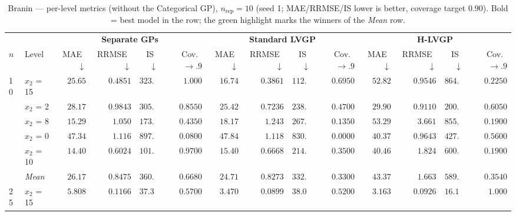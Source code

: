 \begin{table}[htbp]
\centering
\scriptsize
\setlength{\tabcolsep}{2.5pt}
\setlength{\fboxsep}{1pt}
\caption{Branin --- per-level metrics (without the Categorical GP), $n_{\mathrm{rep}}=10$ (seed 1; MAE/RRMSE/IS lower is better, coverage target $0.90$). Bold = best model in the row; the green highlight marks the winners of the \emph{Mean} row.}
\label{tab:branin_hetero_nrep10_nocat}
\begin{tabular}{llrrrrrrrrrrrr}
\toprule
 & & \multicolumn{4}{c}{\textbf{Separate GPs}} & \multicolumn{4}{c}{\textbf{Standard LVGP}} & \multicolumn{4}{c}{\textbf{H-LVGP}} \\
\cmidrule(lr){3-6} \cmidrule(lr){7-10} \cmidrule(lr){11-14}
$n$ & Level & MAE~$\downarrow$ & RRMSE~$\downarrow$ & IS~$\downarrow$ & Cov.~$\to.9$ & MAE~$\downarrow$ & RRMSE~$\downarrow$ & IS~$\downarrow$ & Cov.~$\to.9$ & MAE~$\downarrow$ & RRMSE~$\downarrow$ & IS~$\downarrow$ & Cov.~$\to.9$ \\
\midrule
\multirow{6}{*}{10} & $x_2$ = 15 & $25.65$ & $0.4851$ & $323.4$ & {\boldmath$1.000$} & {\boldmath$16.74$} & {\boldmath$0.3861$} & {\boldmath$112.3$} & $0.6950$ & $52.82$ & $0.9546$ & $864.8$ & $0.2250$ \\
 & $x_2$ = 2 & $28.17$ & $0.9843$ & $305.5$ & {\boldmath$0.8550$} & {\boldmath$25.42$} & {\boldmath$0.7236$} & $238.0$ & $0.4700$ & $29.90$ & $0.9110$ & {\boldmath$200.5$} & $0.6050$ \\
 & $x_2$ = 8 & {\boldmath$15.29$} & {\boldmath$1.050$} & {\boldmath$173.9$} & {\boldmath$0.4350$} & $18.17$ & $1.243$ & $267.8$ & $0.1350$ & $53.29$ & $3.661$ & $855.1$ & $0.1900$ \\
 & $x_2$ = 0 & $47.34$ & $1.116$ & $897.1$ & $0.0800$ & $47.84$ & $1.118$ & $830.0$ & $0.0000$ & {\boldmath$40.37$} & {\boldmath$0.9643$} & {\boldmath$427.8$} & {\boldmath$0.5600$} \\
 & $x_2$ = 10 & {\boldmath$14.40$} & {\boldmath$0.6024$} & {\boldmath$101.4$} & {\boldmath$0.9700$} & $15.40$ & $0.6668$ & $214.7$ & $0.3500$ & $40.46$ & $1.824$ & $600.5$ & $0.1900$ \\
 & \textit{Mean} & $26.17$ & $0.8475$ & $360.3$ & \colorbox{green!20}{\boldmath$0.6680$} & \colorbox{green!20}{\boldmath$24.71$} & \colorbox{green!20}{\boldmath$0.8273$} & \colorbox{green!20}{\boldmath$332.6$} & $0.3300$ & $43.37$ & $1.663$ & $589.7$ & $0.3540$ \\
\midrule
\multirow{6}{*}{25} & $x_2$ = 15 & $5.808$ & $0.1166$ & $37.32$ & $0.5700$ & $3.470$ & {\boldmath$0.0899$} & $38.02$ & $0.5200$ & {\boldmath$3.163$} & $0.0926$ & {\boldmath$16.13$} & {\boldmath$1.000$} \\

\end{tabular}
\end{table}
